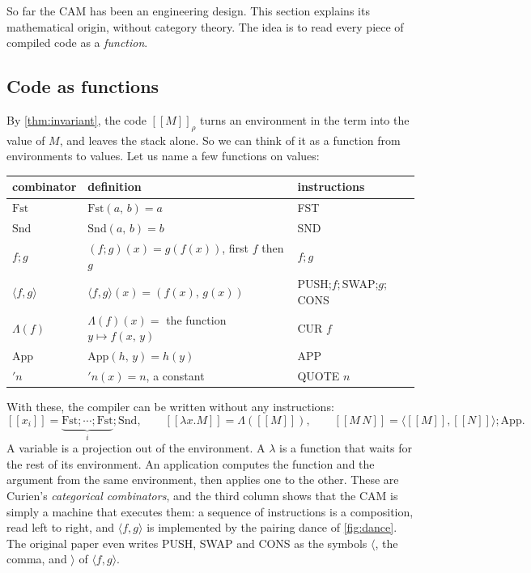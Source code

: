 \documentclass[11pt,a4paper]{article}
\newcommand{\ins}[1]{\textsf{#1}}
\newcommand{\pr}[2]{(#1,\, #2)}
\newcommand{\sem}[1]{[\![#1]\!]}
\newcommand{\seq}{\mathbin{;}}
\newcommand{\cat}[1]{\mathrm{#1}}
\newcommand{\tpair}[2]{\langle #1, #2\rangle}
\theoremstyle{definition}
\theoremstyle{plain}
\begin{document}
So far the CAM has been an engineering design. This section explains its
mathematical origin, without category theory. The idea is to read every piece
of compiled code as a \emph{function}.

\subsection{Code as functions}

By \cref{thm:invariant}, the code $\sem{M}_\rho$ turns an environment in the
term into the value of $M$, and leaves the stack alone. So we can think of it
as a function from environments to values. Let us name a few functions on
values:
\begin{center}
\renewcommand{\arraystretch}{1.2}
\begin{tabular}{@{}l l l@{}}
\toprule
combinator & definition & instructions\\
\midrule
$\cat{Fst}$ & $\cat{Fst}\pr{a}{b} = a$ & \ins{FST}\\
$\cat{Snd}$ & $\cat{Snd}\pr{a}{b} = b$ & \ins{SND}\\
$f\seq g$ & $(f\seq g)(x) = g(f(x))$, first $f$ then $g$ & $f\seq g$\\
$\tpair{f}{g}$ & $\tpair{f}{g}(x) = \pr{f(x)}{g(x)}$ & \ins{PUSH}$\seq f\seq$\ins{SWAP}$\seq g\seq$\ins{CONS}\\
$\Lambda(f)$ & $\Lambda(f)(x) = $ the function $y\mapsto f\pr{x}{y}$ & \ins{CUR} $f$\\
$\cat{App}$ & $\cat{App}\pr{h}{y} = h(y)$ & \ins{APP}\\
$'n$ & $'n(x) = n$, a constant & \ins{QUOTE} $n$\\
\bottomrule
\end{tabular}
\end{center}
With these, the compiler can be written without any instructions:
\[
  \sem{x_i} = \underbrace{\cat{Fst}\seq\cdots\seq\cat{Fst}}_{i}\seq\cat{Snd},
  \qquad
  \sem{\lambda x.M} = \Lambda(\sem{M}),
  \qquad
  \sem{M\,N} = \tpair{\sem{M}}{\sem{N}}\seq\cat{App}.
\]
A variable is a projection out of the environment. A $\lambda$ is a function
that waits for the rest of its environment. An application computes the
function and the argument from the same environment, then applies one to the
other. These are Curien's \emph{categorical combinators}, and the third column
shows that the CAM is simply a machine that executes them: a sequence of
instructions is a composition, read left to right, and
$\tpair{f}{g}$ is implemented by the pairing dance of \cref{fig:dance}. The
original paper even writes \ins{PUSH}, \ins{SWAP} and \ins{CONS} as the
symbols $\langle$, the comma, and $\rangle$ of $\tpair{f}{g}$.
\end{document}
